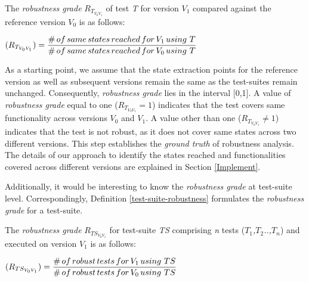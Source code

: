 \theoremstyle{definition}

\begin{definition}{The \textit{robustness grade} $R_{T_{V_{0}V_{1}}}$ of test \textit{T} for version \textit{$V_{1}$} compared against the reference version \textit{$V_{0}$} is as follows:}
\begin{center}
\vspace{0.5cm}
$(R_{T_{V_{0}V_{1}}}) = \displaystyle \frac{\#\thinspace of \thinspace same \thinspace states \thinspace reached \thinspace for \thinspace V_{1} \thinspace using \thinspace \thinspace T}{\# \thinspace of \thinspace same \thinspace states \thinspace reached  \thinspace for \thinspace V_{0} \thinspace using \thinspace \thinspace T}$ \normalsize
\end{center}
\label{test-case-robustness} 
\end{definition} 

As a starting point, we assume that the state extraction points for the reference version as well as subsequent versions remain the same as the test-suites remain unchanged. Consequently, \textit{
robustness grade} lies in the interval [0,1]. A value of \textit{
robustness grade} equal to one ($R_{T_{V_{0}V_{1}}}=1$) indicates that the test covers same functionality across versions \textit{$V_{0}$} and \textit{$V_{1}$}. A value other than one ($R_{T_{V_{0}V_{1}}}\neq 1$) indicates that the test is not robust, as it does not cover same states across two different versions. This step establishes the \textit{ground truth} of robustness analysis. The details of our approach to identify the states reached and functionalities covered across different versions are explained in Section \ref{Implement}.

Additionally, it would be interesting to know the \textit{
robustness grade} at test-suite level. Correspondingly, Definition \ref{test-suite-robustness} formulates the \textit{
robustness grade} for a test-suite.

\theoremstyle{definition}
\begin{definition}{The \textit{robustness grade} $R_{TS_{V_{0}V_{1}}}$ for test-suite \textit{TS} comprising \textit{n} tests (\textit{$T_1$,$T_2$..,$T_n$}) and executed on version \textit{$V_{1}$} is as follows:}
\vspace{0.5cm}
\begin{center}
$(R_{TS_{V_{0}V_{1}}}) = \displaystyle \frac{\#\thinspace of \thinspace robust \thinspace tests \thinspace for \thinspace V_{1} \thinspace using \thinspace \thinspace TS}{\# \thinspace of \thinspace robust \thinspace tests \thinspace for  \thinspace V_{0} \thinspace using \thinspace \thinspace TS}$ \normalsize
\end{center}
\label{test-suite-robustness}
\end{definition}

